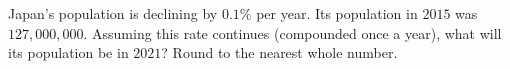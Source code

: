 Japan's population is declining by $0.1\%$ per year. Its population in $2015$ was $127{,}000{,}000$. Assuming this rate continues (compounded once a year), what will its population be in $2021$? Round to the nearest whole number.
